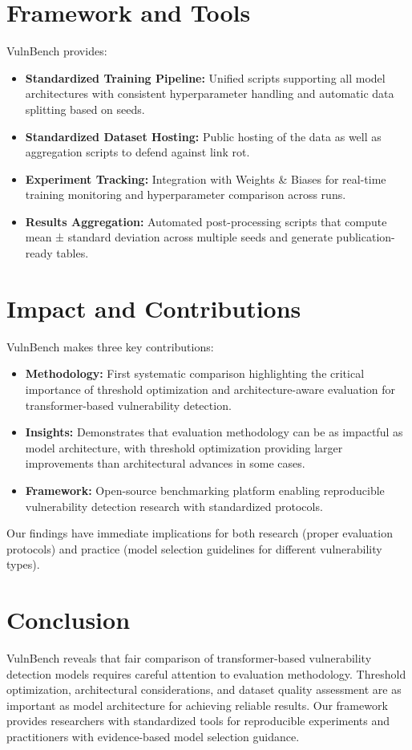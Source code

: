 \documentclass[letterpaper]{article}
\begin{document}
\section{Framework and Tools}

VulnBench provides:
\begin{itemize}
	\item \textbf{Standardized Training Pipeline:} Unified scripts supporting all model architectures with consistent hyperparameter handling and automatic data splitting based on seeds.
	\item \textbf{Standardized Dataset Hosting:} Public hosting of the data as well as aggregation scripts to defend against link rot.
	\item \textbf{Experiment Tracking:} Integration with Weights \& Biases for real-time training monitoring and hyperparameter comparison across runs.
	\item \textbf{Results Aggregation:} Automated post-processing scripts that compute mean ± standard deviation across multiple seeds and generate publication-ready tables.
\end{itemize}
\section{Impact and Contributions}

VulnBench makes three key contributions:
\begin{itemize}
	\item \textbf{Methodology:} First systematic comparison highlighting the critical importance of threshold optimization and architecture-aware evaluation for transformer-based vulnerability detection.
	\item \textbf{Insights:} Demonstrates that evaluation methodology can be as impactful as model architecture, with threshold optimization providing larger improvements than architectural advances in some cases.
	\item \textbf{Framework:} Open-source benchmarking platform enabling reproducible vulnerability detection research with standardized protocols.
\end{itemize}

Our findings have immediate implications for both research (proper evaluation protocols) and practice (model selection guidelines for different vulnerability types).

\section{Conclusion}

VulnBench reveals that fair comparison of transformer-based vulnerability detection models requires careful attention to evaluation methodology. Threshold optimization, architectural considerations, and dataset quality assessment are as important as model architecture for achieving reliable results. Our framework provides researchers with standardized tools for reproducible experiments and practitioners with evidence-based model selection guidance.



\end{document}
